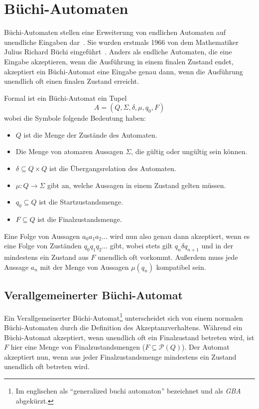 \section{Büchi-Automaten}
Büchi-Automaten stellen eine Erweiterung von endlichen Automaten auf unendliche Eingaben dar~\cite{buchibasics}.
Sie wurden erstmals 1966 von dem Mathematiker Julius Richard Büchi eingeführt~\cite{buchi}.
Anders als endliche Automaten, die eine Eingabe akzeptieren, wenn die Ausführung in einem finalen Zustand endet, akzeptiert ein Büchi-Automat eine Eingabe genau dann, wenn die Ausführung unendlich oft einen finalen Zustand erreicht.

Formal ist ein Büchi-Automat ein Tupel
\[ A = (Q,\Sigma,\delta,\mu,q_0,F) \]
wobei die Symbole folgende Bedeutung haben:
\begin{itemize}
  \item $Q$ ist die Menge der Zustände des Automaten.
  \item Die Menge von atomaren Aussagen $\Sigma$, die gültig oder ungültig sein können.
  \item $\delta\subseteq Q\times Q$ ist die Übergangsrelation des Automaten.
  \item $\mu : Q\rightarrow\Sigma$ gibt an, welche Aussagen in einem Zustand gelten müssen.
  \item $q_0\subseteq Q$ ist die Startzustandsmenge.
  \item $F\subseteq Q$ ist die Finalzustandsmenge.
\end{itemize}
Eine Folge von Aussagen $a_0a_1a_2\dots$ wird nun also genau dann akzeptiert, wenn es eine Folge von Zuständen $q_0q_1q_2\dots$ gibt, wobei stets gilt $q_n\delta q_{n+1}$ und in der mindestens ein Zustand aus $F$ unendlich oft vorkommt.
Außerdem muss jede Aussage $a_n$ mit der Menge von Aussagen $\mu(q_n)$ kompatibel sein.

\subsection{Verallgemeinerter Büchi-Automat}
\label{sec:gba}
Ein Verallgemeinerter Büchi-Automat\footnote{Im englischen als "`generalized buchi automaton"' bezeichnet und als \emph{GBA} abgekürzt.} unterscheidet sich von einem normalen Bü\-chi-Au\-to\-ma\-ten durch die Definition des Akzeptanzverhaltens.
Während ein Büchi-Automat akzeptiert, wenn unendlich oft ein Finalzustand betreten wird, ist $F$ hier eine Menge von Finalzustandsmengen ($F\subseteq\mathcal{P}(Q)$).
Der Automat akzeptiert nun, wenn aus jeder Finalzustandsmenge mindestens ein Zustand unendlich oft betreten wird.

